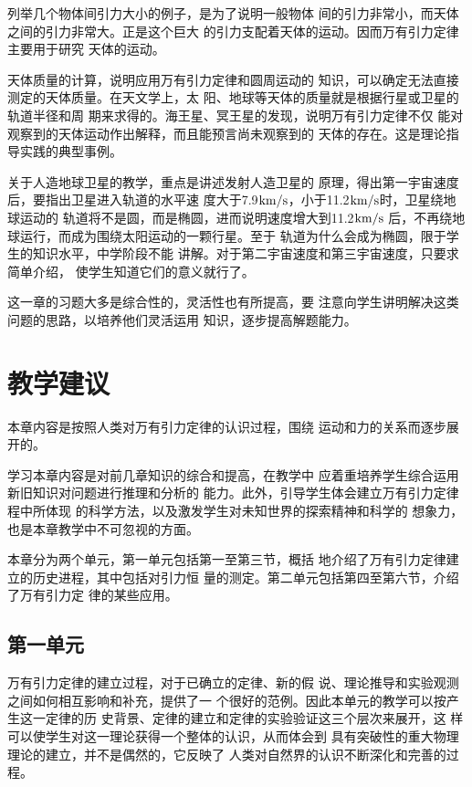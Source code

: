 列举几个物体间引力大小的例子，是为了说明一般物体
间的引力非常小，而天体之间的引力非常大。正是这个巨大
的引力支配着天体的运动。因而万有引力定律主要用于研究
天体的运动。

天体质量的计算，说明应用万有引力定律和圆周运动的
知识，可以确定无法直接测定的天体质量。在天文学上，太
阳、地球等天体的质量就是根据行星或卫星的轨道半径和周
期来求得的。海王星、冥王星的发现，说明万有引力定律不仅
能对观察到的天体运动作出解释，而且能预言尚未观察到的
天体的存在。这是理论指导实践的典型事例。

关于人造地球卫星的教学，重点是讲述发射人造卫星的
原理，得出第一宇宙速度后，要指出卫星进入轨道的水平速
度大于7.9${\rm km/s}$，小于11.2${\rm km/s}$时，卫星绕地球运动的
轨道将不是圆，而是椭圆，进而说明速度增大到11.2${\rm km/s}$
后，不再绕地球运行，而成为围绕太阳运动的一颗行星。至于
轨道为什么会成为椭圆，限于学生的知识水平，中学阶段不能
讲解。对于第二宇宙速度和第三宇宙速度，只要求简单介绍，
使学生知道它们的意义就行了。

这一章的习题大多是综合性的，灵活性也有所提高，要
注意向学生讲明解决这类问题的思路，以培养他们灵活运用
知识，逐步提高解题能力。

\section{教学建议}
本章内容是按照人类对万有引力定律的认识过程，围绕
运动和力的关系而逐步展开的。

学习本章内容是对前几章知识的综合和提高，在教学中
应着重培养学生综合运用新旧知识对问题进行推理和分析的
能力。此外，引导学生体会建立万有引力定律程中所体现
的科学方法，以及激发学生对未知世界的探索精神和科学的
想象力，也是本章教学中不可忽视的方面。

本章分为两个单元，第一单元包括第一至第三节，概括
地介绍了万有引力定律建立的历史进程，其中包括对引力恒
量的测定。第二单元包括第四至第六节，介绍了万有引力定
律的某些应用。

\subsection{第一单元}

万有引力定律的建立过程，对于已确立的定律、新的假
说、理论推导和实验观测之间如何相互影响和补充，提供了一
个很好的范例。因此本单元的教学可以按产生这一定律的历
史背景、定律的建立和定律的实验验证这三个层次来展开，这
样可以使学生对这一理论获得一个整体的认识，从而体会到
具有突破性的重大物理理论的建立，并不是偶然的，它反映了
人类对自然界的认识不断深化和完善的过程。

